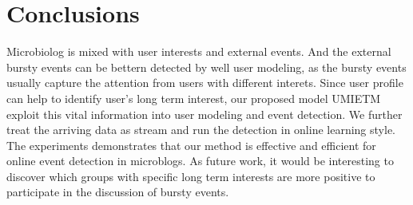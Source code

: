 \documentclass[runningheads,a4paper]{llncs}
\begin{document}
\section{Conclusions}
Microbiolog is mixed with user interests and external events. 
And the external bursty events can be bettern detected by well user modeling, as the bursty events usually capture the attention from users with different interets.
Since user profile can help to identify user's long term interest, our proposed model UMIETM exploit this vital information into user modeling and event detection.
We further treat the arriving data as stream and run the detection in online learning style.
The experiments demonstrates that our method is effective and efficient for online event detection in microblogs. 
As future work, it would be interesting to discover which groups with specific long term interests are more positive to participate in the discussion of bursty events.



\end{document}
